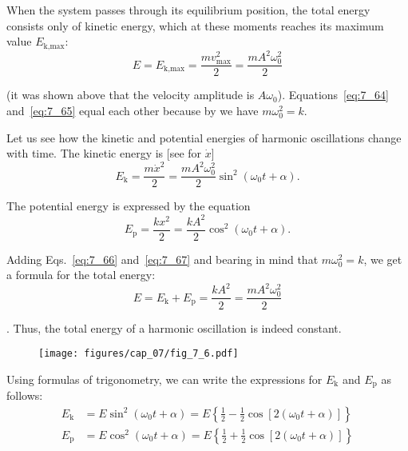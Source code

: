 \noindent
When the system passes through its equilibrium position, the total energy consists only of kinetic energy, which at these moments reaches its maximum value $E_{\text{k,max}}$:
\vspace{-12pt}
\begin{equation}\label{eq:7_65}
	E = E_{\text{k,max}} = \frac{mv_{\text{max}}^2}{2} = \frac{mA^2\omega_0^2}{2}
\end{equation}

\noindent
(it was shown above that the velocity amplitude is $A\omega_0$). Equations~\eqref{eq:7_64} and~\eqref{eq:7_65} equal each other because by  we have $m\omega_0^2=k$.

Let us see how the kinetic and potential energies of harmonic oscillations change with time. The kinetic energy is [see  for $\dot{x}$]
\begin{equation}\label{eq:7_66}
	E_{\text{k}} = \frac{m\dot{x}^2}{2} = \frac{mA^2\omega_0^2}{2}\sin^2(\omega_0 t + \alpha).
\end{equation}

\noindent
The potential energy is expressed by the equation
\begin{equation}\label{eq:7_67}
	E_{\text{p}} = \frac{kx^2}{2} = \frac{kA^2}{2}\cos^2(\omega_0 t + \alpha).
\end{equation}

\noindent
Adding Eqs.~\eqref{eq:7_66} and~\eqref{eq:7_67} and bearing in mind that $m\omega_0^2=k$, we get a formula for the total energy:
\begin{equation}\label{eq:7_68}
	E = E_{\text{k}} + E_{\text{p}}= \frac{kA^2}{2} = \frac{mA^2\omega_0^2}{2}
\end{equation}

. Thus, the total energy of a harmonic oscillation is indeed constant.

\begin{figure}[t]
	\begin{center}
		\texttt{[image: figures/cap\_07/fig\_7\_6.pdf]}
		\caption[]{}
		\label{fig:7_6}
	\end{center}
	\vspace{-0.85cm}
\end{figure}

Using formulas of trigonometry, we can write the expressions for $E_{\text{k}}$ and $E_{\text{p}}$ as follows:
\begin{align}
	E_{\text{k}} &= E\sin^2(\omega_0 t + \alpha) = E \left\{\frac{1}{2} - \frac{1}{2}\cos[2(\omega_0 t + \alpha)]\right\}\label{eq:7_69}\\
	E_{\text{p}} &= E\cos^2(\omega_0 t + \alpha) = E \left\{\frac{1}{2} + \frac{1}{2}\cos[2(\omega_0 t + \alpha)]\right\}\label{eq:7_70}
\end{align}

